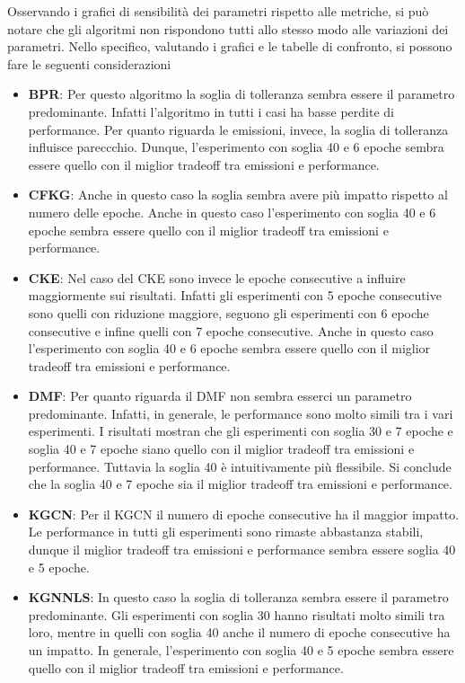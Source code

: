 \noindent Osservando i grafici di sensibilità dei parametri rispetto alle metriche, si può notare che gli algoritmi non rispondono tutti allo stesso modo alle variazioni dei parametri.
Nello specifico, valutando i grafici e le tabelle di confronto, si possono fare le seguenti considerazioni
\begin{itemize}
    \item \textbf{BPR}: Per questo algoritmo la soglia di tolleranza sembra essere il parametro predominante. Infatti l'algoritmo in tutti i casi ha basse perdite di performance. Per quanto riguarda le emissioni, invece, la soglia di tolleranza influisce pareccchio. Dunque, l'esperimento con soglia 40 e 6 epoche sembra essere quello con il miglior tradeoff tra emissioni e performance.
    \item \textbf{CFKG}: Anche in questo caso la soglia sembra avere più impatto rispetto al numero delle epoche. Anche in questo caso l'esperimento con soglia 40 e 6 epoche sembra essere quello con il miglior tradeoff tra emissioni e performance.
    \item \textbf{CKE}: Nel caso del CKE sono invece le epoche consecutive a influire maggiormente sui risultati. Infatti gli esperimenti con 5 epoche consecutive sono quelli con riduzione maggiore, seguono gli esperimenti con 6 epoche consecutive e infine quelli con 7 epoche consecutive. Anche in questo caso l'esperimento con soglia 40 e 6 epoche sembra essere quello con il miglior tradeoff tra emissioni e performance.
    \item \textbf{DMF}: Per quanto riguarda il DMF non sembra esserci un parametro predominante. Infatti, in generale, le performance sono molto simili tra i vari esperimenti. I risultati mostran che gli esperimenti con soglia 30 e 7 epoche e soglia 40 e 7 epoche siano quello con il miglior tradeoff tra emissioni e performance. Tuttavia la soglia 40 è intuitivamente più flessibile. Si conclude che la soglia 40 e 7 epoche sia il miglior tradeoff tra emissioni e performance.
    \item \textbf{KGCN}: Per il KGCN il numero di epoche consecutive ha il maggior impatto. Le performance in tutti gli esperimenti sono rimaste abbastanza stabili, dunque il miglior tradeoff tra emissioni e performance sembra essere soglia 40 e 5 epoche.
    \item \textbf{KGNNLS}: In questo caso la soglia di tolleranza sembra essere il parametro predominante. Gli esperimenti con soglia 30 hanno risultati molto simili tra loro, mentre in quelli con soglia 40 anche il numero di epoche consecutive ha un impatto. In generale, l'esperimento con soglia 40 e 5 epoche sembra essere quello con il miglior tradeoff tra emissioni e performance.

\end{itemize}
